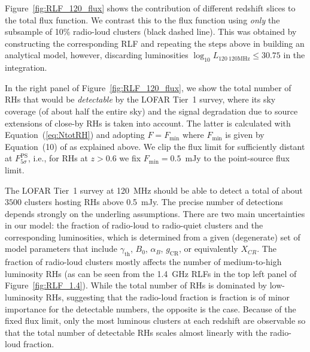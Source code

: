 \documentclass[traditabstract]{aa}
\newcommand{\rmn}{\mathrm}
\begin{document}
Figure~\ref{fig:RLF_120_flux} shows the contribution of different redshift
slices to the total flux function. We contrast this to the flux function using
\emph{only} the subsample of 10\% radio-loud clusters (black dashed line). This
was obtained by constructing the corresponding RLF and repeating the steps above
in building an analytical model, however, discarding luminosities $\log_{10}
L_{120~\rmn{120MHz}} \leq 30.75$ in the integration.

In the right panel of Figure~\ref{fig:RLF_120_flux}, we show the total number of
RHs that would be \emph{detectable} by the LOFAR Tier~1 survey, where its sky
coverage (of about half the entire sky) and the signal degradation due to source
extensions of close-by RHs is taken into account. The latter is calculated with
Equation~(\ref{eq:NtotRH}) and adopting $F = F_{\rmn{min}}$ where
$F_{\rmn{min}}$ is given by Equation~(10) of \cite{2010A&A...509A..68C} as
explained above. We clip the flux limit for sufficiently distant at
$F_{5\sigma}^{\rmn{PS}}$, i.e., for RHs at $z > 0.6$ we fix $F_{\rmn{min}} =
0.5$~mJy to the point-source flux limit.

The LOFAR Tier~1 survey at 120~MHz should be able to detect a total of about
$3500$ clusters hosting RHs above 0.5~mJy. The precise number of detections
depends strongly on the underling assumptions. There are two main uncertainties
in our model: the fraction of radio-loud to radio-quiet clusters and the
corresponding luminosities, which is determined from a given (degenerate) set of
model parameters that include $\gamma_{\rmn{th}}$, $B_{0}$, $\alpha_{B}$,
$g_{\rmn{CR}}$, or equivalently $X_{CR}$. The fraction of radio-loud clusters
mostly affects the number of medium-to-high luminosity RHs (as can be seen from
the 1.4~GHz RLFs in the top left panel of Figure~\ref{fig:RLF_1.4}). While the
total number of RHs is dominated by low-luminosity RHs, suggesting that the
radio-loud fraction is fraction is of minor importance for the detectable
numbers, the opposite is the case. Because of the fixed flux limit, only the
most luminous clusters at each redshift are observable so that the total number
of detectable RHs scales almost linearly with the radio-loud fraction.

\end{document}
